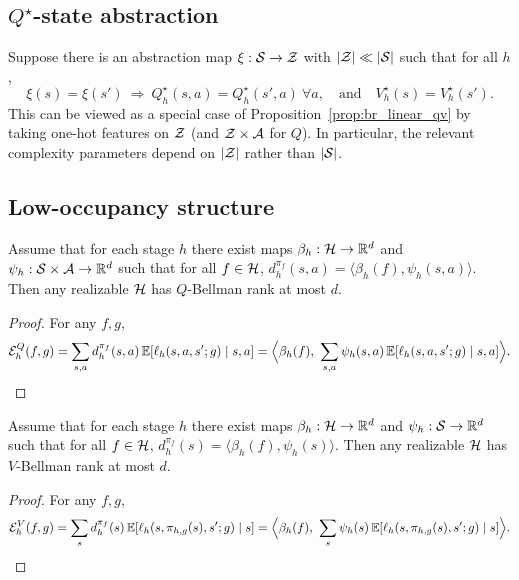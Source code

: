 \subsection{$Q^\star$-state abstraction}
\label{subsec:br_zoo_abstraction}

Suppose there is an abstraction map $\xi:\mathcal{S}\to\mathcal{Z}$ with $|\mathcal{Z}|\ll|\mathcal{S}|$ such that for all $h$,
\[
\xi(s)=\xi(s')\ \Rightarrow\ Q_h^\star(s,a)=Q_h^\star(s',a)\ \forall a,
\quad\text{and}\quad
V_h^\star(s)=V_h^\star(s').
\]
This can be viewed as a special case of Proposition~\ref{prop:br_linear_qv} by taking one-hot features
on $\mathcal{Z}$ (and $\mathcal{Z}\times\mathcal{A}$ for $Q$).  In particular, the relevant complexity parameters depend
on $|\mathcal{Z}|$ rather than $|\mathcal{S}|$.

\subsection{Low-occupancy structure}
\label{subsec:br_zoo_occupancy}

\begin{proposition}
\label{prop:br_low_occ_q}
Assume that for each stage $h$ there exist maps $\beta_h:\mathcal{H}\to\mathbb{R}^d$ and
$\psi_h:\mathcal{S}\times\mathcal{A}\to\mathbb{R}^d$ such that for all $f\in\mathcal{H}$,
$d_h^{\pi_f}(s,a)=\langle \beta_h(f),\psi_h(s,a)\rangle$.
Then any realizable $\mathcal{H}$ has $Q$-Bellman rank at most $d$.
\end{proposition}

\begin{proof}
For any $f,g$,
\[
\mathcal{E}_h^{Q}(f,g)
=
\sum_{s,a} d_h^{\pi_f}(s,a)\,\mathbb{E}[\ell_h(s,a,s';g)\mid s,a]
=
\Big\langle \beta_h(f),\ \sum_{s,a}\psi_h(s,a)\,\mathbb{E}[\ell_h(s,a,s';g)\mid s,a]\Big\rangle.
\]
\end{proof}

\begin{proposition}
\label{prop:br_low_occ_v}
Assume that for each stage $h$ there exist maps $\beta_h:\mathcal{H}\to\mathbb{R}^d$ and $\psi_h:\mathcal{S}\to\mathbb{R}^d$
such that for all $f\in\mathcal{H}$, $d_h^{\pi_f}(s)=\langle \beta_h(f),\psi_h(s)\rangle$.
Then any realizable $\mathcal{H}$ has $V$-Bellman rank at most $d$.
\end{proposition}

\begin{proof}
For any $f,g$,
\[
\mathcal{E}_h^{V}(f,g)
=
\sum_{s} d_h^{\pi_f}(s)\,\E[\ell_h(s,\pi_{h,g}(s),s';g)\mid s]
=
\Big\langle \beta_h(f),\ \sum_{s}\psi_h(s)\,\E[\ell_h(s,\pi_{h,g}(s),s';g)\mid s]\Big\rangle.
\]
\end{proof}

